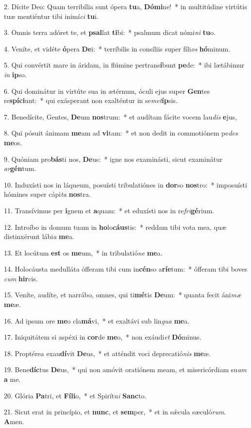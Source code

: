 2. Dícite Deo: Quam terribília sunt ópera \textbf{tu}a, \textbf{Dó}\textbf{mi}ne!~*  in multitúdine virtútis tuæ mentiéntur tibi inimí\textit{ci} \textbf{tu}i.\

3. Omnis terra adóret te, et \textbf{psal}lat \textbf{ti}bi:~*  psalmum dicat nómi\textit{ni} \textbf{tu}o.\

4. Veníte, et vidéte \textbf{ó}pera \textbf{De}i:~*  terríbilis in consíliis super fíli\textit{os} \textbf{hó}minum.\

5. Qui convértit mare in áridam, in flúmine pertrans\textbf{í}bunt \textbf{pe}de:~*  ibi lætábimur \textit{in} \textbf{ip}so.\

6. Qui dominátur in virtúte sua in ætérnum, óculi ejus super \textbf{Gen}tes re\textbf{spí}\textbf{ci}unt:~*  qui exásperant non exalténtur in se\textit{met}\textbf{íp}sis.\

7. Benedícite, Gentes, \textbf{De}um \textbf{nos}trum:~*  et audítam fácite vocem lau\textit{dis} \textbf{e}jus,\

8. Qui pósuit ánimam \textbf{me}am ad \textbf{vi}tam:~*  et non dedit in commotiónem pe\textit{des} \textbf{me}os.\

9. Quóniam pro\textbf{bás}ti nos, \textbf{De}us:~*  igne nos examinásti, sicut examinátur \textit{ar}\textbf{gén}tum.\

10. Induxísti nos in láqueum, posuísti tribulatiónes in \textbf{dor}so \textbf{nos}tro:~*  imposuísti hómines super cápi\textit{ta} \textbf{nos}tra.\

11. Transívimus per \textbf{i}gnem et \textbf{a}quam:~*  et eduxísti nos in re\textit{fri}\textbf{gé}rium.\

12. Introíbo in domum tuam in \textbf{ho}lo\textbf{cáus}tis:~*  reddam tibi vota mea, quæ distinxérunt lábi\textit{a} \textbf{me}a.\

13. Et locútum \textbf{est} os \textbf{me}um,~*  in tribulatió\textit{ne} \textbf{me}a.\

14. Holocáusta medulláta ófferam tibi cum in\textbf{cén}so a\textbf{rí}\textbf{e}tum:~*  ófferam tibi boves \textit{cum} \textbf{hir}cis.\

15. Veníte, audíte, et narrábo, omnes, qui ti\textbf{mé}tis \textbf{De}um:~*  quanta fecit áni\textit{mæ} \textbf{me}æ.\

16. Ad ipsum ore \textbf{me}o cla\textbf{má}vi,~*  et exaltávi sub lin\textit{gua} \textbf{me}a.\

17. Iniquitátem si aspéxi in \textbf{cor}de \textbf{me}o,~*  non exáudi\textit{et} \textbf{Dó}minus.\

18. Proptérea exau\textbf{dí}vit \textbf{De}us,~*  et atténdit voci deprecatió\textit{nis} \textbf{me}æ.\

19. Bene\textbf{díc}tus \textbf{De}us,~*  qui non amóvit oratiónem meam, et misericórdiam su\textit{am} \textbf{a} me.\

20. Glória \textbf{Pa}tri, et \textbf{Fí}\textbf{li}o,~*  et Spirítu\textit{i} \textbf{Sanc}to.\

21. Sicut erat in princípio, et \textbf{nunc}, et \textbf{sem}per,~*  et in sǽcula sæculó\textit{rum}. \textbf{A}men.\

